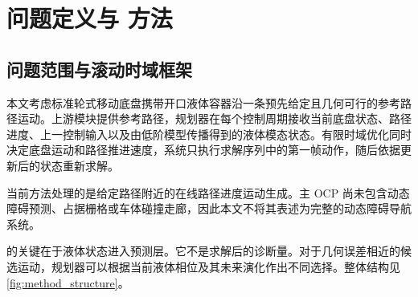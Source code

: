 \section{问题定义与 \SPMPC{} 方法}

\subsection{问题范围与滚动时域框架}

本文考虑标准轮式移动底盘携带开口液体容器沿一条预先给定且几何可行的参考路径运动。上游模块提供参考路径，规划器在每个控制周期接收当前底盘状态、路径进度、上一控制输入以及由低阶模型传播得到的液体模态状态。有限时域优化同时决定底盘运动和路径推进速度，系统只执行求解序列中的第一帧动作，随后依据更新后的状态重新求解。

当前方法处理的是给定路径附近的在线路径进度运动生成。主 OCP 尚未包含动态障碍预测、占据栅格或车体碰撞走廊，因此本文不将其表述为完整的动态障碍导航系统。

\SPMPC{} 的关键在于液体状态进入预测层。它不是求解后的诊断量。对于几何误差相近的候选运动，规划器可以根据当前液体相位及其未来演化作出不同选择。整体结构见 \cref{fig:method_structure}。


